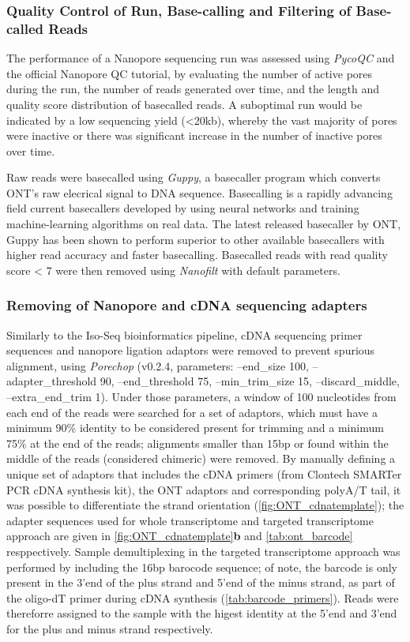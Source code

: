 \subsubsection{Quality Control of Run, Base-calling and Filtering of Base-called Reads}
The performance of a Nanopore sequencing run was assessed using \textit{PycoQC}\cite{Leger2019} and the official Nanopore QC tutorial\cite{ONT2019NanoporeQC}, by evaluating the number of active pores during the run, the number of reads generated over time, and the length and quality score distribution of basecalled reads. A suboptimal run would be indicated by a low sequencing yield (<20kb), whereby the vast majority of pores were inactive or there was significant increase in the number of inactive pores over time. 

Raw reads were basecalled using \textit{Guppy}, a basecaller program which converts ONT's raw elecrical signal to DNA sequence. Basecalling is a rapidly advancing field current basecallers developed by using neural networks and training machine-learning algorithms on real data\cite{Wick2019}. The latest released basecaller by ONT, Guppy has been shown to perform superior to other available basecallers with higher read accuracy and faster basecalling\cite{Wick2019}. Basecalled reads with read quality score < 7 were then removed using \textit{Nanofilt}\cite{DeCoster2018} with default parameters. 

\subsubsection{Removing of Nanopore and cDNA sequencing adapters}
Similarly to the Iso-Seq bioinformatics pipeline, cDNA sequencing primer sequences and nanopore ligation adaptors were removed to prevent spurious alignment, using \textit{Porechop}\cite{Wick2017} (v0.2.4, parameters: --end\_size 100, --adapter\_threshold 90, --end\_threshold 75, --min\_trim\_size 15, --discard\_middle, --extra\_end\_trim 1). Under those parameters, a window of 100 nucleotides from each end of the reads were searched for a set of adaptors, which must have a minimum 90\% identity to be considered present for trimming and a minimum 75\% at the end of the reads; alignments smaller than 15bp or found within the middle of the reads (considered chimeric) were removed. By manually defining a unique set of adaptors that includes the cDNA primers (from Clontech SMARTer PCR cDNA synthesis kit), the ONT adaptors and corresponding polyA/T tail, it was possible to differentiate the strand orientation (\cref{fig:ONT_cdnatemplate}); the adapter sequences used for whole transcriptome and targeted transcriptome approach are given in \cref{fig:ONT_cdnatemplate}\textbf{b} and \cref{tab:ont_barcode} resppectively. Sample demultiplexing in the targeted transcriptome approach was performed by including the 16bp barocode sequence; of note, the barcode is only present in the 3'end of the plus strand and 5'end of the minus strand, as part of the oligo-dT primer during cDNA synthesis (\cref{tab:barcode_primers}). Reads were thereforre assigned to the sample with the higest identity at the 5'end and 3'end for the plus and minus strand respectively. 

